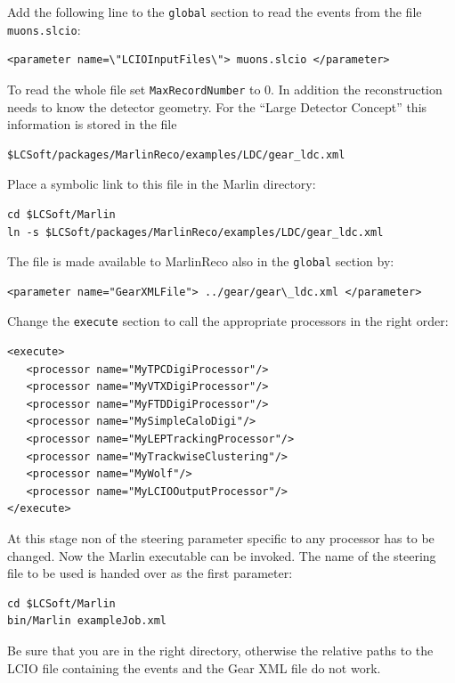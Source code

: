 Add the following 
line to the {\tt global} section to read the events from 
the file {\tt muons.slcio}:

\begin{verbatim}
<parameter name=\"LCIOInputFiles\"> muons.slcio </parameter>
\end{verbatim}

To read the whole file set {\tt MaxRecordNumber} to 0. In addition the 
reconstruction needs to know the detector geometry. 
For the ``Large Detector Concept'' this information is stored
in the file

\begin{verbatim}
$LCSoft/packages/MarlinReco/examples/LDC/gear_ldc.xml  
\end{verbatim}

Place a symbolic link to this file in the Marlin directory:

\begin{verbatim}
cd $LCSoft/Marlin
ln -s $LCSoft/packages/MarlinReco/examples/LDC/gear_ldc.xml
\end{verbatim}

The file is made available to 
MarlinReco also in the {\tt global} section by:

\begin{verbatim}
<parameter name="GearXMLFile"> ../gear/gear\_ldc.xml </parameter>
\end{verbatim}

Change the {\tt execute} section to call the appropriate processors in the
right order:

\begin{verbatim}
<execute>
   <processor name="MyTPCDigiProcessor"/>
   <processor name="MyVTXDigiProcessor"/>
   <processor name="MyFTDDigiProcessor"/>
   <processor name="MySimpleCaloDigi"/>
   <processor name="MyLEPTrackingProcessor"/>
   <processor name="MyTrackwiseClustering"/>
   <processor name="MyWolf"/>
   <processor name="MyLCIOOutputProcessor"/>
</execute>
\end{verbatim}

At this stage non of the steering parameter specific to any 
processor has to be changed. Now the Marlin executable can be invoked. 
The name of the steering file to be used is handed over as the first 
parameter:

\begin{verbatim}
cd $LCSoft/Marlin
bin/Marlin exampleJob.xml
\end{verbatim}

Be sure that you are in the right directory, otherwise the relative
paths to the LCIO file containing the events and the Gear XML file do
not work. 

